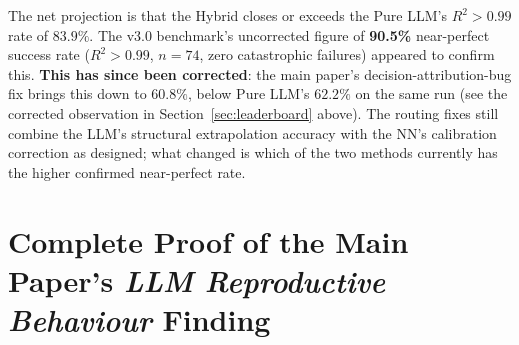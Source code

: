 \documentclass[twoside,11pt]{article}
\begin{document}
\bigskip
\noindent The net projection is that the Hybrid closes or exceeds the Pure
LLM's $R^2 > 0.99$ rate of $83.9\%$. The v3.0 benchmark's uncorrected
figure of \textbf{90.5\%} near-perfect success rate ($R^2>0.99$, $n=74$,
zero catastrophic failures) appeared to confirm this. \textbf{This has
since been corrected}: the main paper's decision-attribution-bug fix
brings this down to $60.8\%$, below Pure LLM's $62.2\%$ on the same run
(see the corrected observation in Section~\ref{sec:leaderboard} above).
The routing fixes still combine the LLM's structural extrapolation
accuracy with the NN's calibration correction as designed; what changed
is which of the two methods currently has the higher confirmed
near-perfect rate.

\appendix

\section{Complete Proof of the Main Paper's \emph{LLM Reproductive Behaviour} Finding}
\label{app:proof}
\end{document}

